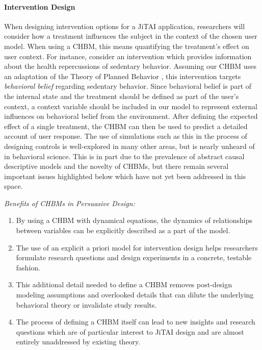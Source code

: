 \documentclass[runningheads,a4paper]{llncs}
\begin{document}

\paragraph{Intervention Design}
When designing intervention options for a JiTAI application, researchers will consider how a treatment influences the subject in the context of the chosen user model.
When using a CHBM, this means quantifying the treatment's effect on user context.
For instance, consider an intervention which provides information about the health repercussions of sedentary behavior.
Assuming our CHBM uses an adaptation of the Theory of Planned Behavior \cite{ajzen1991theory}, this intervention targets \emph{behavioral belief} regarding sedentary behavior.
Since behavioral belief is part of the internal state and the treatment should be defined as part of the user's context, a context variable should be included in our model to represent external influences on behavioral belief from the environment.
After defining the expected effect of a single treatment, the CHBM can then be used to predict a detailed account of user response.
The use of simulations such as this in the process of designing controls is well-explored in many other areas, but is nearly unheard of in behavioral science.
This is in part due to the prevalence of abstract causal descriptive models and the novelty of CHBMs, but there remain several important issues highlighted below which have not yet been addressed in this space.

\emph{Benefits of CHBMs in Persuasive Design:}
\begin{enumerate}
    \item By using a CHBM with dynamical equations, the dynamics of relationships between variables can be explicitly described as a part of the model.
    \item The use of an explicit a priori model for intervention design helps researchers formulate research questions and design experiments in a concrete, testable fashion.
    \item This additional detail needed to define a CHBM removes post-design modeling assumptions and overlooked details that can dilute the underlying behavioral theory or invalidate study results.
    \item The process of defining a CHBM itself can lead to new insights and research questions which are of particular interest to JiTAI design and are almost entirely unaddressed by existing theory.
\end{enumerate}
\end{document}
